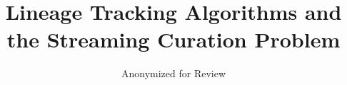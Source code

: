 \title{ Lineage Tracking Algorithms and the Streaming Curation Problem }
\author{
    Anonymized for Review
}
\date{}

\newcommand{\affil}[1]{\textsuperscript{#1}}




